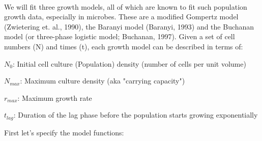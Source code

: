 \documentclass[11pt]{article}
\begin{document}
    
    
    \begin{center}
    \end{center}
    { \hspace*{\fill} \\}
    
    We will fit three growth models, all of which are known to fit such
population growth data, especially in microbes. These are a modified
Gompertz model (Zwietering et. al., 1990), the Baranyi model (Baranyi,
1993) and the Buchanan model (or three-phase logistic model; Buchanan,
1997). Given a set of cell numbers (N) and times (t), each growth model
can be described in terms of:

\(N_0\): Initial cell culture (Population) density (number of cells per
unit volume)

\(N_{max}\): Maximum culture density (aka "carrying capacity")

\(r_{max}\): Maximum growth rate

\(t_{lag}\): Duration of the lag phase before the population starts
growing exponentially

First let's specify the model functions:
\end{document}
